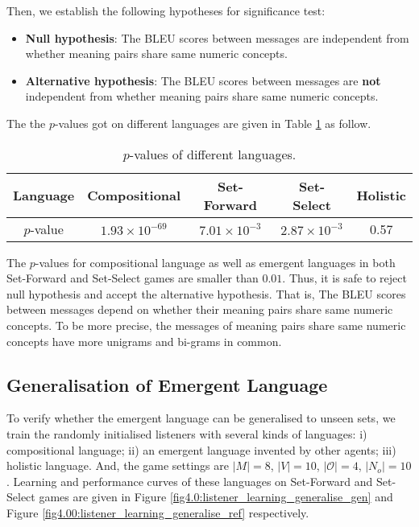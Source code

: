 Then, we establish the following hypotheses for significance test:

\begin{itemize}
    \item \textbf{Null hypothesis}: The BLEU scores between messages are independent from whether meaning pairs share same numeric concepts.
    \item \textbf{Alternative hypothesis}: The BLEU scores between messages are \textbf{not} independent from whether meaning pairs share same numeric concepts.
\end{itemize}

The the $p$-values got on different languages are given in Table \ref{tab4.5:p-values} as follow.

\begin{table}[!h]
    \centering
    \begin{tabular}{|c|c|c|c|c|}
    \hline
    Language  & Compositional         & Set-Forward          & Set-Select           & Holistic \\ \hline
    $p$-value & $1.93\times 10^{-69}$ & $7.01\times 10^{-3}$ & $2.87\times 10^{-3}$ & 0.57 \\ \hline
    \end{tabular}
    \caption{$p$-values of different languages.}
    \label{tab4.5:p-values}
\end{table}

The $p$-values for compositional language as well as emergent languages in both Set-Forward and Set-Select games are smaller than $0.01$. Thus, it is safe to reject null hypothesis and accept the alternative hypothesis. That is, The BLEU scores between messages depend on whether their meaning pairs share same numeric concepts. To be more precise, the messages of meaning pairs share same numeric concepts have more unigrams and bi-grams in common.

\subsection{Generalisation of Emergent Language}
\label{ssec4.2.4:emergent_lan_generalise}

To verify whether the emergent language can be generalised to unseen sets, we train the randomly initialised listeners with several kinds of languages: i) compositional language; ii) an emergent language invented by other agents; iii) holistic language. And, the game settings are $|M|=8$, $|V|=10$, $|\mathcal{O}|=4$, $|N_{o}|=10$. Learning and performance curves of these languages on Set-Forward and Set-Select games are given in  Figure \ref{fig4.0:listener_learning_generalise_gen} and Figure \ref{fig4.00:listener_learning_generalise_ref} respectively.

